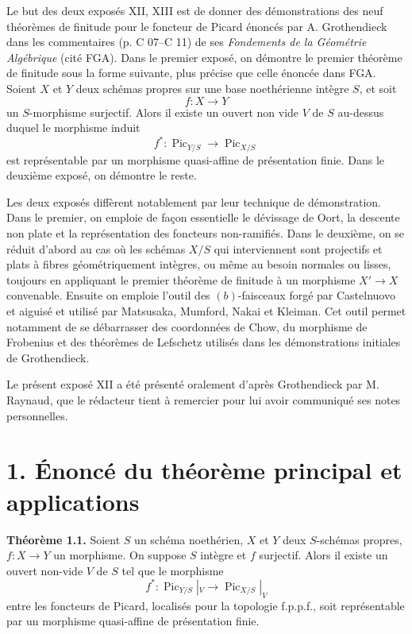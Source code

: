 \documentclass[11pt]{article}
\providecommand{\Pic}{\operatorname{Pic}}
\begin{document}
Le but des deux exposés XII, XIII est de donner des démonstrations des neuf théorèmes de finitude pour le foncteur de Picard énoncés par A. Grothendieck dans les commentaires (p. C 07--C 11) de ses \emph{Fondements de la Géométrie Algébrique} (cité FGA). Dans le premier exposé, on démontre le premier théorème de finitude sous la forme suivante, plus précise que celle énoncée dans FGA. Soient \(X\) et \(Y\) deux schémas propres sur une base noethérienne intègre \(S\), et soit
\[
  f:X\longrightarrow Y
\]
un \(S\)-morphisme surjectif. Alors il existe un ouvert non vide \(V\) de \(S\) au-dessus duquel le morphisme induit
\[
  f^*:\Pic_{Y/S}\longrightarrow \Pic_{X/S}
\]
est représentable par un morphisme quasi-affine de présentation finie. Dans le deuxième exposé, on démontre le reste.

Les deux exposés diffèrent notablement par leur technique de démonstration. Dans le premier, on emploie de façon essentielle le dévissage de Oort, la descente non plate et la représentation des foncteurs non-ramifiés. Dans le deuxième, on se réduit d'abord au cas où les schémas \(X/S\) qui interviennent sont projectifs et plats à fibres géométriquement intègres, ou même au besoin normales ou lisses, toujours en appliquant le premier théorème de finitude à un morphisme \(X'\to X\) convenable. Ensuite on emploie l'outil des \((b)\)-faisceaux forgé par Castelnuovo et aiguisé et utilisé par Matsusaka, Mumford, Nakai et Kleiman. Cet outil permet notamment de se débarrasser des coordonnées de Chow, du morphisme de Frobenius et des théorèmes de Lefschetz utilisés dans les démonstrations initiales de Grothendieck.

Le présent exposé XII a été présenté oralement d'après Grothendieck par M. Raynaud, que le rédacteur tient à remercier pour lui avoir communiqué ses notes personnelles.

\section*{1. Énoncé du théorème principal et applications}

\textbf{Théorème 1.1.} Soient \(S\) un schéma noethérien, \(X\) et \(Y\) deux \(S\)-schémas propres, \(f:X\to Y\) un morphisme. On suppose \(S\) intègre et \(f\) surjectif. Alors il existe un ouvert non-vide \(V\) de \(S\) tel que le morphisme
\[
  f^*:\Pic_{Y/S}|_V\longrightarrow \Pic_{X/S}|_V
\]
entre les foncteurs de Picard, localisés pour la topologie f.p.p.f., soit représentable par un morphisme quasi-affine de présentation finie.
\end{document}
